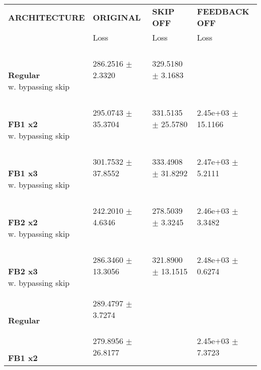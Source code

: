 
\begin{table}[ht]
    \centering
    \begin{tabular}{|>{\columncolor{gray!05}}l|l|l|l|}
        \hline
        \rowcolor{white}
        \textbf{\footnotesize ARCHITECTURE} & \textbf{\footnotesize ORIGINAL} & \textbf{\footnotesize SKIP OFF} & \textbf{\footnotesize FEEDBACK OFF} \\

        \rowcolor{white}
        & {\footnotesize Loss} & {\footnotesize Loss} & {\footnotesize Loss} \\
        \hline
\shortstack[l]{\\ {} \\ \textbf{Regular}\\{w. bypassing skip}} & 286.2516 $\pm$ 2.3320 & 329.5180 $\pm$ 3.1683 &  \\
 \hline 
\shortstack[l]{\\ {} \\ \textbf{FB1 x2}\\{w. bypassing skip}} & 295.0743 $\pm$ 35.3704 & 331.5135 $\pm$ 25.5780 & 2.45e+03 $\pm$ 15.1166 \\
 \hline 
\shortstack[l]{\\ {} \\ \textbf{FB1 x3}\\{w. bypassing skip}} & 301.7532 $\pm$ 37.8552 & 333.4908 $\pm$ 31.8292 & 2.47e+03 $\pm$ 5.2111 \\
 \hline 
\shortstack[l]{\\ {} \\ \textbf{FB2 x2}\\{w. bypassing skip}} & 242.2010 $\pm$ 4.6346 & 278.5039 $\pm$ 3.3245 & 2.46e+03 $\pm$ 3.3482 \\
 \hline 
\shortstack[l]{\\ {} \\ \textbf{FB2 x3}\\{w. bypassing skip}} & 286.3460 $\pm$ 13.3056 & 321.8900 $\pm$ 13.1515 & 2.48e+03 $\pm$ 0.6274 \\
 \hline 
\shortstack[l]{\\ {} \\ \textbf{Regular}\\{}} & 289.4797 $\pm$ 3.7274 &  &  \\
 \hline 
\shortstack[l]{\\ {} \\ \textbf{FB1 x2}\\{}} & 279.8956 $\pm$ 26.8177 &  & 2.45e+03 $\pm$ 7.3723 \\

\end{tabular}
\end{table}
